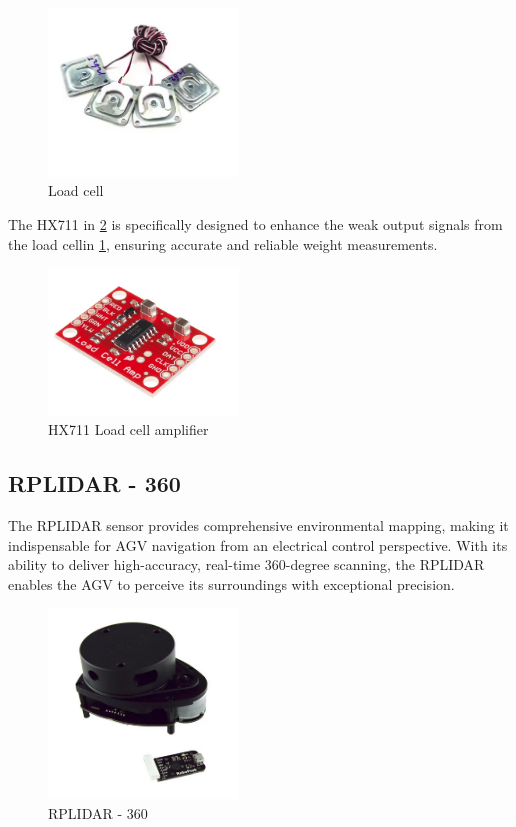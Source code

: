 \documentclass[../../main]{subfiles}
\begin{document}
\begin{figure}[H]
    \centering
    \includegraphics[width=0.45\textwidth]{fig/4_cells.png}
    \caption{ Load cell }
    \label{Load cell} %
\end{figure}

The HX711 in \cref{HX711 Load cell amplifier} is specifically designed to enhance the weak 
output signals from the load cellin \cref{Load cell}, ensuring accurate and reliable weight measurements.

\begin{figure}[H]
    \centering
    \includegraphics[width=0.45\textwidth]{fig/load_cell_amplifier.png}
    \caption{ HX711 Load cell amplifier }
    \label{HX711 Load cell amplifier} %
\end{figure}


\subsection{RPLIDAR - 360}

The RPLIDAR sensor provides comprehensive environmental mapping, making it indispensable for AGV navigation 
from an electrical control perspective. With its ability to deliver high-accuracy, real-time 360-degree
scanning, the RPLIDAR enables the AGV to perceive its surroundings with exceptional precision.

\begin{figure}[H]
    \centering
    \includegraphics[width=0.45\textwidth]{fig/lidar.png}
    \caption{ RPLIDAR - 360}
    \label{ RPLIDAR - 360 } %
\end{figure}
\end{document}
